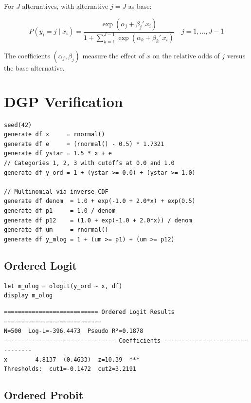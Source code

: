 For $J$ alternatives, with alternative $j=J$ as base:

\[
  P(y_i = j \mid x_i) = \frac{\exp(\alpha_j + \beta_j'\,x_i)}{1 + \sum_{k=1}^{J-1} \exp(\alpha_k + \beta_k'\,x_i)}
  \quad j = 1,\ldots,J-1
\]

The coefficients $(\alpha_j, \beta_j)$ measure the effect of $x$ on the relative
odds of $j$ versus the base alternative.

\section{DGP Verification}

\begin{lstlisting}[caption={DGP for ordered and multinomial models}]
seed(42)
generate df x     = rnormal()
generate df e     = (rnormal() - 0.5) * 1.7321
generate df ystar = 1.5 * x + e
// Categories 1, 2, 3 with cutoffs at 0.0 and 1.0
generate df y_ord = 1 + (ystar >= 0.0) + (ystar >= 1.0)

// Multinomial via inverse-CDF
generate df denom  = 1.0 + exp(-1.0 + 2.0*x) + exp(0.5)
generate df p1     = 1.0 / denom
generate df p12    = (1.0 + exp(-1.0 + 2.0*x)) / denom
generate df um     = rnormal()
generate df y_mlog = 1 + (um >= p1) + (um >= p12)
\end{lstlisting}

\subsection*{Ordered Logit}

\begin{lstlisting}
let m_olog = ologit(y_ord ~ x, df)
display m_olog
\end{lstlisting}

\begin{lstlisting}[language={}, basicstyle=\ttfamily\small,
  frame=none, numbers=none, backgroundcolor=\color{codbg},
  xleftmargin=0pt, xrightmargin=0pt, breaklines=false]
=========================== Ordered Logit Results ============================
N=500  Log-L=-396.4473  Pseudo R²=0.1878
-------------------------------- Coefficients --------------------------------
x        4.8137  (0.4633)  z=10.39  ***
Thresholds:  cut1=-0.1472  cut2=3.2191
\end{lstlisting}

\subsection*{Ordered Probit}

